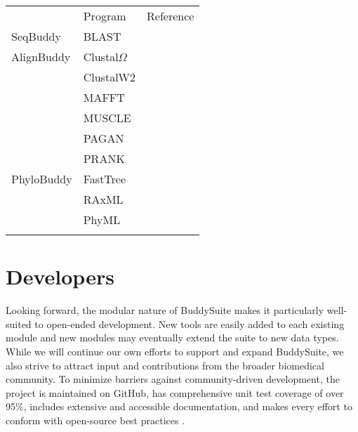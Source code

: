 \documentclass[nogrid]{MBE}%
\begin{document}
\begin{table}[!t]
      {\tabcolsep=5pt\begin{tabular}{@{\extracolsep{\fill}}lll@{}}
      \toprule
	   						& Program								& Reference
      \\\colrule
      SeqBuddy				& BLAST 								& \cite{Camacho2009}
      \\\colrule
      AlignBuddy			& Clustal$\Omega$						& \cite{Sievers:2011fn} \\
        					& ClustalW2 							& \cite{Larkin:2007hz} \\
							& MAFFT 								& \cite{Katoh:2013hm} \\
							& MUSCLE 								& \cite{Edgar:2004bo} \\
							& PAGAN 								& \cite{Loytynoja:2012fy} \\
        					& PRANK 								& \cite{Loytynoja:2005cb}		
      \\\colrule
      PhyloBuddy			& FastTree								& \cite{Price:2010eg} \\
        					& RAxML 								& \cite{Stamatakis:2006de} \\
        					& PhyML 								& \cite{Guindon:2010gf}
      \\\botrule
      \end{tabular}}
{}
\end{table}

\section{Developers}
Looking forward, the modular nature of BuddySuite makes it particularly well-suited to open-ended development. New tools are easily added to each existing module and new modules may eventually extend the suite to new data types. While we will continue our own efforts to support and expand BuddySuite, we also strive to attract input and contributions from the broader biomedical community. To minimize barriers against community-driven development, the project is maintained on GitHub, has comprehensive unit test coverage of over 95\%, includes extensive and accessible documentation, and makes every effort to conform with open-source best practices \cite{Leprevost:2014gx,Seemann:2013ci}.
\end{document}
